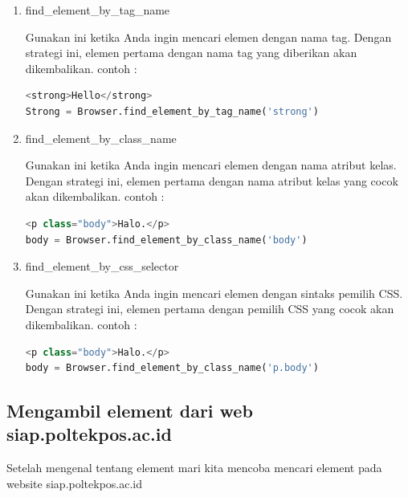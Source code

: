 \begin{enumerate}
\item find\_element\_by\_tag\_name
\par Gunakan ini ketika Anda ingin mencari elemen dengan nama tag. Dengan strategi ini, elemen pertama dengan nama tag yang diberikan akan dikembalikan.
contoh :
\begin{lstlisting}[language=Python]
<strong>Hello</strong> 
Strong = Browser.find_element_by_tag_name('strong')
\end{lstlisting}

\item find\_element\_by\_class\_name
\par Gunakan ini ketika Anda ingin mencari elemen dengan nama atribut kelas. Dengan strategi ini, elemen pertama dengan nama atribut kelas yang cocok akan dikembalikan. 
contoh :
\begin{lstlisting}[language=Python]
<p class="body">Halo.</p>
body = Browser.find_element_by_class_name('body')
\end{lstlisting}

\item find\_element\_by\_css\_selector
\par Gunakan ini ketika Anda ingin mencari elemen dengan sintaks pemilih CSS. Dengan strategi ini, elemen pertama dengan pemilih CSS yang cocok akan dikembalikan. 
contoh : 
\begin{lstlisting}[language=Python]
<p class="body">Halo.</p> 
body = Browser.find_element_by_class_name('p.body')
\end{lstlisting}

\end{enumerate}

\subsection{Mengambil element dari web siap.poltekpos.ac.id}
\par Setelah mengenal tentang element mari kita mencoba mencari element pada website siap.poltekpos.ac.id
\newpage

